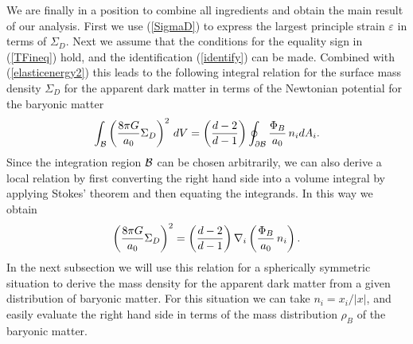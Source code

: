 \documentclass[a4paper,12pt]{article}
\begin{document}
We are finally in a position to combine all ingredients and obtain the main result of our analysis.  First we use (\ref{SigmaD}) to express the largest principle strain $\varepsilon$ in terms of $\Sigma_D$.  Next we assume that the conditions for the equality sign in (\ref{TFineq}) hold, and the identification (\ref{identify}) can be made. Combined with (\ref{elasticenergy2}) this leads to the following integral relation for the surface mass density $\Sigma_D$ for the apparent dark matter in terms of the Newtonian potential for the baryonic matter 
\begin{equation}
\label{integralrelation}
	\int_{\cal B} \left({8\pi G\over a_0}\Sigma_D\right)^2\, dV = 	\left( {d-2\over d-1}\right) \oint_{\partial {\cal B}}   {\Phi_B \over a_0} \,  n_i dA_i.
\end{equation}
Since the integration region $\cal B$ can be chosen arbitrarily, we can also derive a local relation by first converting the right hand side into a volume integral by applying Stokes' theorem and then equating  the integrands.  In this way we obtain 
\begin{equation}
\label{newrelation}
\left({8\pi G\over a_0}\Sigma_D\right)^2= \left( {d-2\over d-1}\right) \nabla_i 	\left({\Phi_B \over a_0} \,  n_i\right).
\end{equation}
In the next subsection we will use this relation for a spherically symmetric situation to derive the mass density for the apparent dark matter from a given distribution of baryonic matter. 
For this situation we can take $n_i=x_i/|x|$, and easily evaluate the right hand side in terms of the mass distribution $\rho_B$ of the baryonic matter. 












\end{document}
